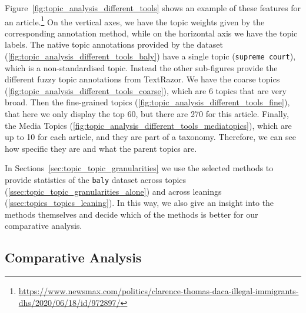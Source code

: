 Figure~\ref{fig:topic_analysis_different_tools} shows an example of these features for an article.\footnote{\url{https://www.newsmax.com/politics/clarence-thomas-daca-illegal-immigrants-dhs/2020/06/18/id/972897/}}
On the vertical axes, we have the topic weights given by the corresponding annotation method, while on the horizontal axis we have the topic labels.
The native topic annotations provided by the dataset (\ref{fig:topic_analysis_different_tools_baly}) have a single topic (\texttt{supreme court}), which is a non-standardised topic.
%
Instead the other sub-figures provide the different fuzzy topic annotations from TextRazor.
We have the coarse topics (\ref{fig:topic_analysis_different_tools_coarse}), which are 6 topics that are very broad. Then the fine-grained topics (\ref{fig:topic_analysis_different_tools_fine}), that here we only display the top 60, but there are 270 for this article.
Finally, the Media Topics (\ref{fig:topic_analysis_different_tools_mediatopics}), which are up to 10 for each article, and they are part of a taxonomy.  Therefore, we can see how specific they are and what the parent topics are.


In Sections~\ref{sec:topic_topic_granularities} we use the selected methods to provide statistics of the \texttt{baly} dataset across topics (\ref{ssec:topic_topic_granularities_alone}) and across leanings (\ref{ssec:topics_topics_leaning}). In this way, we also give an insight into the methods themselves and decide which of the methods is better for our comparative analysis.

\subsection{\statusgreen Comparative Analysis}
\label{sec:topic_method_comparative}

